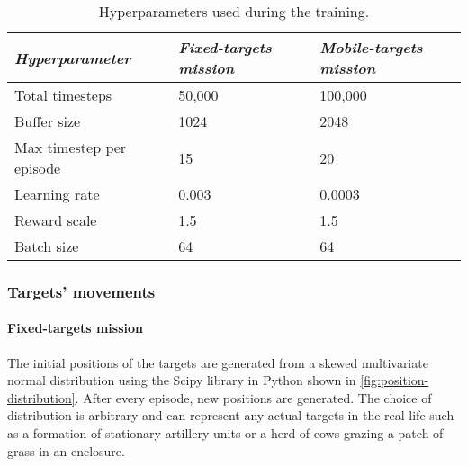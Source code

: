 \documentclass[../main.tex]{subfiles}
\begin{document}
\begin{table}[tbp]
    \centering
    \caption{Hyperparameters used during the training.}
    \label{tab:hyperparameters}
    \begin{tabularx}{0.8\textwidth}{ X l l }
        \toprule
        \textit{Hyperparameter} 
            & \textit{Fixed-targets mission} 
                & \textit{Mobile-targets mission} \\

        \midrule
        
        Total timesteps
            & 50,000 
                & 100,000 
                \\
        Buffer size 
            & 1024 
                & 2048 
                \\
        
                \raggedright Max timestep per \newline 
                \hphantom{M} episode
            & 15
                & 20
                \\

        Learning rate
            & 0.003
                & 0.0003
                \\
        
        Reward scale
            & 1.5 
                & 1.5 
                \\

        Batch size
            & 64
                & 64
                \\

        \bottomrule		
    \end{tabularx}
\end{table}

\subsubsection{Targets' movements}

\paragraph{Fixed-targets mission}

The initial positions of the targets are generated from a skewed
multivariate normal distribution using the Scipy library in Python
shown in \cref{fig:position-distribution}.
After every episode, new positions are generated.
The choice of distribution is arbitrary and can represent any actual
targets in the real life such as a formation of stationary artillery
units or a herd of cows grazing a patch of grass in an enclosure.
\end{document}
